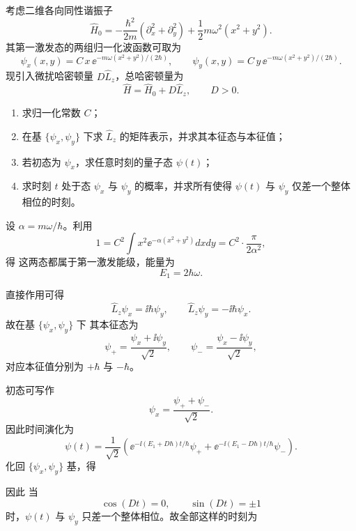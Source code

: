 \begin{question}
考虑二维各向同性谐振子
\[
\hat H_0=-\frac{\hbar^2}{2m}(\partial_x^2+\partial_y^2)+\frac12 m\omega^2(x^2+y^2).
\]
其第一激发态的两组归一化波函数可取为
\[
\psi_x(x,y)=C\,x\,\ee^{-m\omega(x^2+y^2)/(2\hbar)},
\qquad
\psi_y(x,y)=C\,y\,\ee^{-m\omega(x^2+y^2)/(2\hbar)}.
\]
现引入微扰哈密顿量 $D\hat L_z$，总哈密顿量为
\[
\hat H=\hat H_0+D\hat L_z,
\qquad D>0.
\]

\begin{enumerate}[label=(\arabic*),leftmargin=2.5em]
  \item 求归一化常数 $C$；
  \item 在基 $\{\psi_x,\psi_y\}$ 下求 $\hat L_z$ 的矩阵表示，并求其本征态与本征值；
  \item 若初态为 $\psi_x$，求任意时刻的量子态 $\psi(t)$；
  \item 求时刻 $t$ 处于态 $\psi_x$ 与 $\psi_y$ 的概率，并求所有使得 $\psi(t)$ 与 $\psi_y$ 仅差一个整体相位的时刻。
\end{enumerate}

\begin{solution}
设 $\alpha=m\omega/\hbar$。利用
\[
1=C^2\int x^2 \ee^{-\alpha(x^2+y^2)}dxdy=C^2\cdot \frac{\pi}{2\alpha^2},
\]
得
这两态都属于第一激发能级，能量为
\[
E_1=2\hbar\omega.
\]

直接作用可得
\[
\hat L_z\psi_x=\ii\hbar\psi_y,
\qquad
\hat L_z\psi_y=-\ii\hbar\psi_x.
\]
故在基 $\{\psi_x,\psi_y\}$ 下
其本征态为
\[
\psi_+=\frac{\psi_x+\ii\psi_y}{\sqrt2},
\qquad
\psi_-=\frac{\psi_x-\ii\psi_y}{\sqrt2},
\]
对应本征值分别为 $+\hbar$ 与 $-\hbar$。

初态可写作
\[
\psi_x=\frac{\psi_++\psi_-}{\sqrt2}.
\]
因此时间演化为
\[
\psi(t)=\frac{1}{\sqrt2}\left(\ee^{-\ii(E_1+D\hbar)t/\hbar}\psi_++\ee^{-\ii(E_1-D\hbar)t/\hbar}\psi_-\right).
\]
化回 $\{\psi_x,\psi_y\}$ 基，得

因此
当
\[
\cos(Dt)=0,
\qquad \sin(Dt)=\pm 1
\]
时，$\psi(t)$ 与 $\psi_y$ 只差一个整体相位。故全部这样的时刻为
\end{solution}
\end{question}

